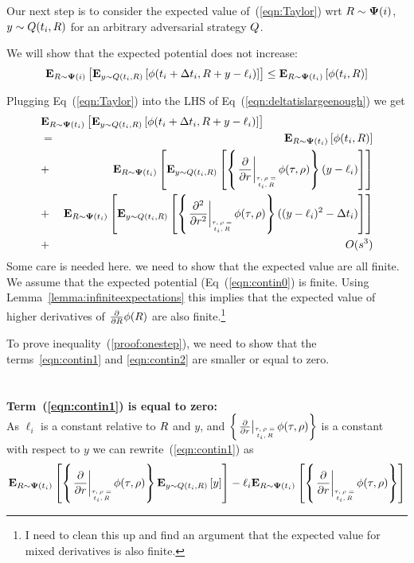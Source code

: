\documentclass{article}[12pt]
\begin{document}
{{Our next step is to consider the expected value of~(\ref{eqn:Taylor}) wrt $R \sim {\bf \Psi}(i)$,
$y \sim Q(t_i,R)$ for an arbitrary adversarial strategy
$Q$.

We will show that the expected potential does not increase:
\begin{equation} \label{eqn:deltatislargeenough}
     {\bf E}_{R \sim {\bf \Psi}(i)}\left[  {\bf E}_{y \sim Q(t_i,R)}\left[ \phi(t_i+\Delta t_i,R+y-\ell_i) \right] \right] \leq {\bf E}_{R \sim {\bf \Psi}(t_i)}\left[ \phi(t_i,R) \right]
\end{equation}

Plugging Eq~(\ref{eqn:Taylor}) into the LHS of
Eq~(\ref{eqn:deltatislargeenough}) we get
\begin{eqnarray}
  \lefteqn{\E{\R \sim \state(t_i)}{\E{y \sim \adversM(t_i,\R)}{\pot(t_i+\deltat_i,\R+y-\ell_i)}}} \\
  &=& \E{\R \sim \state(t_i)}{\pot(t_i,\R)} \label{eqn:contin0}\\
  &+& \E{\R \sim \state(t_i)}{\E{y \sim \adversM(t_i,\R)}{\at{\frac{\partial}{\partial r}} (y-\ell_i)}} \label{eqn:contin1}\\
  &+& \E{\R \sim \state(t_i)}{\E{y \sim
      \adversM(t_i,\R)}{\at{\frac{\partial^2}{\partial r^2}}
      ((y-\ell_i)^2 - \deltat_i)}}
  \label{eqn:contin2}\\
  &+& O(s^3) \label{eqn:contin3}
\end{eqnarray}
Some care is needed here. we need to show that the expected value
are all finite. We assume that the expected potential
(Eq~(\ref{eqn:contin0}) is finite. Using
Lemma~\ref{lemma:infiniteexpectations} this implies that the expected
value of higher derivatives of $\frac{\partial}{\partial R} \phi(R)$
are also finite.\footnote{I need to clean this up and find an argument
  that the expected value for mixed derivatives is also finite.}


To prove inequality~(\ref{proof:onestep}), we need to show that the
terms~\ref{eqn:contin1} and \ref{eqn:contin2} are smaller or equal to
zero.
~\\~\\~\\
{\bf Term~(\ref{eqn:contin1}) is equal to zero:}\\
As $\ell_i$ is a constant
relative to $R$ and $y$, and $\at{\frac{\partial}{\partial r}}$ is a
constant with respect to $y$ we can rewrite~(\ref{eqn:contin1}) as
\begin{equation} \label{eqnterm1.1}
  \E{\R \sim \state(t_i)}{\at{\frac{\partial}{\partial r}}
    \E{y \sim \adversM(t_i,\R)}{y} }
- \ell_i \E{\R \sim \state(t_i)}{\at{\frac{\partial}{\partial r}}}
\end{equation}

}}
\end{document}
